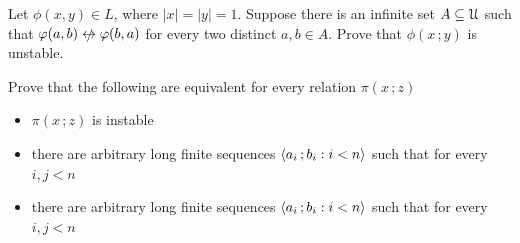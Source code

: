 \begin{exercise}
  Let $\phi(x,y)\in  L$, where $|x|=|y|=1$.
  Suppose there is an infinite set $A\subseteq\EuScript U$ such that $\phi(a,b)\niff\phi(b,a)$ for every two distinct $a,b\in A$.
  Prove that $\phi(x\,;y)$ is unstable.
\end{exercise}

\begin{exercise}
  Prove that the following are equivalent for every relation $\pi(x\,;z)$
  \begin{itemize}
    \item [1.] $\pi(x\,;z)$ is instable
    \item [2.] there are arbitrary long finite sequences $\langle a_i\,;b_i : i<n\rangle$ such that for every $i,j<n$


    \item [3.] there are arbitrary long finite sequences $\langle a_i\,;b_i : i<n\rangle$ such that for every $i,j<n$

  \end{itemize}
\end{exercise}

  
  
  
